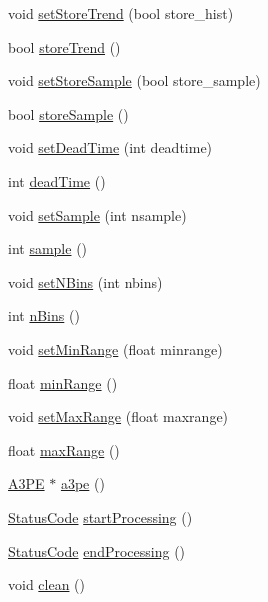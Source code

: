 \begin{DoxyCompactItemize}
\item 
void \hyperlink{classAcquisition_a1ceff272a1ad030dcd20c0dcddc65443}{set\+Store\+Trend} (bool store\+\_\+hist)
\item 
bool \hyperlink{classAcquisition_a5af693448daef6e9e054ab7f1aa50784}{store\+Trend} ()
\item 
void \hyperlink{classAcquisition_af36a1b660244096b7d274f591f67b695}{set\+Store\+Sample} (bool store\+\_\+sample)
\item 
bool \hyperlink{classAcquisition_a9af304e0fb2076cd4f92703708efe83e}{store\+Sample} ()
\item 
void \hyperlink{classAcquisition_a37e05315fc47958c290a7d938c61e067}{set\+Dead\+Time} (int deadtime)
\item 
int \hyperlink{classAcquisition_a8fb2cd60a34993ab0952d719a8517831}{dead\+Time} ()
\item 
void \hyperlink{classAcquisition_ade6fd6483b3e3737fe7dcdffb5065954}{set\+Sample} (int nsample)
\item 
int \hyperlink{classAcquisition_a83181975c0746e5837d53933031e7b62}{sample} ()
\item 
void \hyperlink{classAcquisition_a6ee040a009aa48f848b1e12434135db9}{set\+N\+Bins} (int nbins)
\item 
int \hyperlink{classAcquisition_a3a3dad0de9535d5a29c0810a5bdc3ae3}{n\+Bins} ()
\item 
void \hyperlink{classAcquisition_a8a15ffc6e539a3ae12efe4bea1ca7587}{set\+Min\+Range} (float minrange)
\item 
float \hyperlink{classAcquisition_a44f441710231748d2ca8f691647b2bcd}{min\+Range} ()
\item 
void \hyperlink{classAcquisition_a786da6cff5428020034be23e554e0e1b}{set\+Max\+Range} (float maxrange)
\item 
float \hyperlink{classAcquisition_a386f3ebc6b1d4956aa7e40b314ddb4eb}{max\+Range} ()
\item 
\hyperlink{classA3PE}{A3\+PE} $\ast$ \hyperlink{classAcquisition_a8af496b6202d2509814e3b02197a5e73}{a3pe} ()
\item 
\hyperlink{classStatusCode}{Status\+Code} \hyperlink{classProcessus_a09319bde9bed93e290f69b4e04585543}{start\+Processing} ()
\item 
\hyperlink{classStatusCode}{Status\+Code} \hyperlink{classProcessus_a5e4da662989d356b89d490b89c7afbfd}{end\+Processing} ()
\item 
void \hyperlink{classProcessus_aaeb17673b98d2b39f3aa780e335e0968}{clean} ()
\item 

\end{DoxyCompactItemize}
